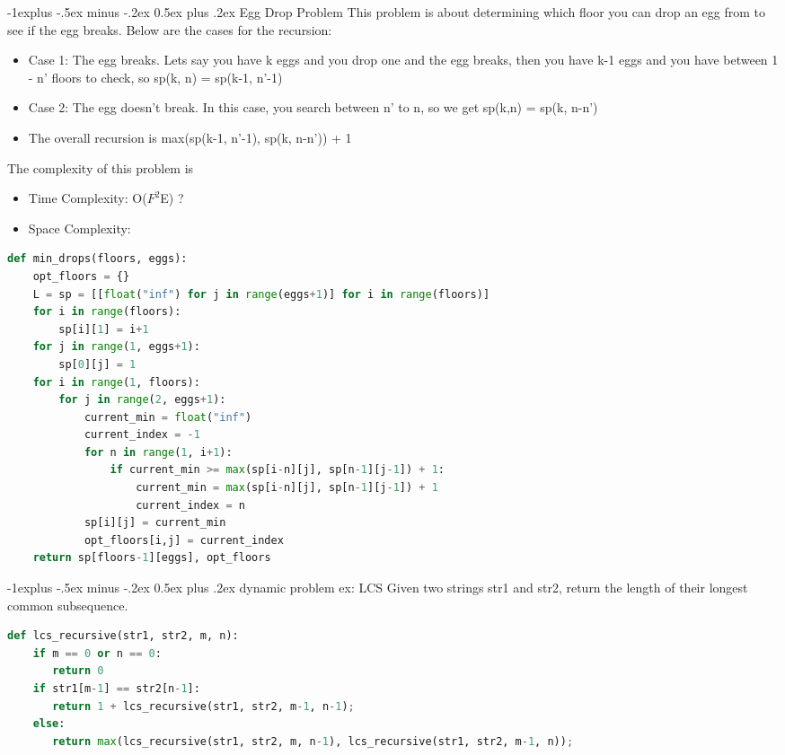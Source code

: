 \documentclass[letterpaper, 8pt]{extarticle}
\makeatletter
\renewcommand{\subsection}{\@startsection{subsection}{2}{0mm}%
                                {-1explus -.5ex minus -.2ex}%
                                {0.5ex plus .2ex}%
                                {\normalfont\small\bfseries}}
\makeatother
\begin{document}
\begin{multicols*}{5}
\subsection{Egg Drop Problem}
This problem is about determining which floor you can drop an egg from to see if the egg breaks. Below are the cases for the recursion:
\begin{itemize}
    \item Case 1: The egg breaks. Lets say you have k eggs and you drop one and the egg breaks, then you have k-1 eggs and you have between 1 - n' floors to check, so sp(k, n) = sp(k-1, n'-1)
    \item Case 2: The egg doesn't break. In this case, you search between n' to n, so we get sp(k,n) = sp(k, n-n')
    \item The overall recursion is max(sp(k-1, n'-1), sp(k, n-n')) + 1
\end{itemize}
The complexity of this problem is
\begin{itemize}
    \item Time Complexity: O($F^2$E) ?
    \item Space Complexity:
\end{itemize}
\begin{lstlisting}[language=Python]
def min_drops(floors, eggs):
    opt_floors = {}
    L = sp = [[float("inf") for j in range(eggs+1)] for i in range(floors)]
    for i in range(floors):
        sp[i][1] = i+1
    for j in range(1, eggs+1):
        sp[0][j] = 1
    for i in range(1, floors):
        for j in range(2, eggs+1):
            current_min = float("inf")
            current_index = -1
            for n in range(1, i+1):
                if current_min >= max(sp[i-n][j], sp[n-1][j-1]) + 1:
                    current_min = max(sp[i-n][j], sp[n-1][j-1]) + 1
                    current_index = n
            sp[i][j] = current_min
            opt_floors[i,j] = current_index
    return sp[floors-1][eggs], opt_floors
\end{lstlisting}
\subsection{dynamic problem ex: LCS}
Given two strings str1 and str2, return the length of their longest common subsequence.
\begin{lstlisting}[language=Python]
def lcs_recursive(str1, str2, m, n): 
    if m == 0 or n == 0: 
       return 0
    if str1[m-1] == str2[n-1]: 
       return 1 + lcs_recursive(str1, str2, m-1, n-1); 
    else: 
       return max(lcs_recursive(str1, str2, m, n-1), lcs_recursive(str1, str2, m-1, n));


\end{lstlisting}
\end{multicols*}
\end{document}
